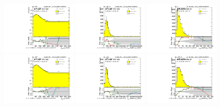 \begin{figure}[htbp!]
\begin{center}
\includegraphics[angle=270, width=0.32\textwidth]{./figures/boosted/Reweight/Fits/Moriond_NoTag_4Trk_lead_Incl_sublHCand_Pt_m_1.pdf}
\includegraphics[angle=270, width=0.32\textwidth]{./figures/boosted/Reweight/Fits/Moriond_NoTag_4Trk_lead_Incl_sublHCand_trk0_Pt.pdf}
\includegraphics[angle=270, width=0.32\textwidth]{./figures/boosted/Reweight/Fits/Moriond_NoTag_4Trk_lead_Incl_sublHCand_trk1_Pt.pdf} \\
\includegraphics[angle=270, width=0.32\textwidth]{./figures/boosted/Reweight/Fits/Moriond_bkg_0_NoTag_4Trk_lead_Incl_sublHCand_Pt_m_1.pdf}
\includegraphics[angle=270, width=0.32\textwidth]{./figures/boosted/Reweight/Fits/Moriond_bkg_0_NoTag_4Trk_lead_Incl_sublHCand_trk0_Pt.pdf}
\includegraphics[angle=270, width=0.32\textwidth]{./figures/boosted/Reweight/Fits/Moriond_bkg_0_NoTag_4Trk_lead_Incl_sublHCand_trk1_Pt.pdf} \\

\end{center}
\end{figure}
